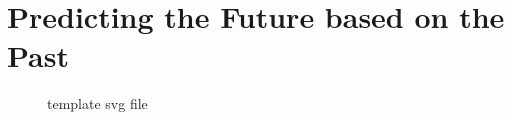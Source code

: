 \chapter{Predicting the Future based on the Past}

\begin{figure}[h]
    \centering
    
    \caption{template svg file}
\end{figure}
 
